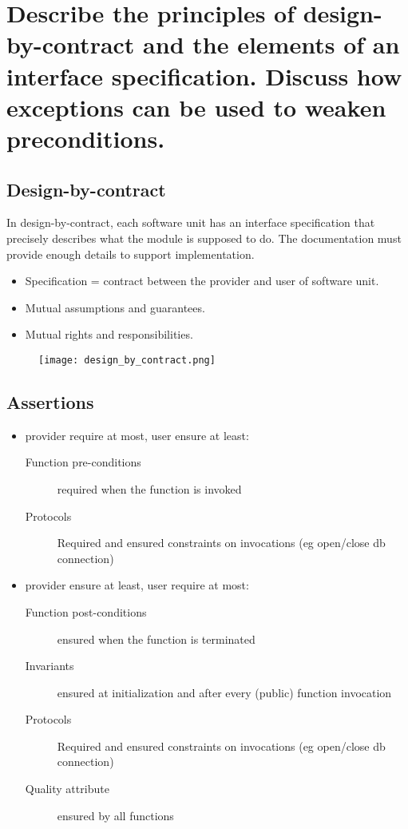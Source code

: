 \clearpage{}
\section{Describe the principles of design-by-contract and the elements
of an interface specification. Discuss how exceptions can be used to
weaken preconditions.}


\subsection{Design-by-contract}

In design-by-contract, each software unit has an interface specification that precisely
describes what the module is supposed to do. The documentation must provide enough
details to support implementation. 

\begin{itemize}
    \item Specification = contract between the provider and user of software unit. 
    \item Mutual assumptions and guarantees. 
    \item Mutual rights and responsibilities.
\end{itemize}

\begin{figure}[!ht]
    \centering
    \texttt{[image: design\_by\_contract.png]}
\end{figure}

\subsection{Assertions}

\begin{itemize}
        \item provider require at most, user ensure at least:
\begin{description}
    \item[Function pre-conditions] required when the function is invoked
    \item[Protocols] Required and ensured constraints on invocations (eg open/close db connection)
\end{description}

        \item provider ensure at least, user require at most:
\begin{description}
    \item[Function post-conditions] ensured when the function is terminated
    \item[Invariants] ensured at initialization and after every (public) function invocation
    \item[Protocols] Required and ensured constraints on invocations (eg open/close db connection)
    \item[Quality attribute] ensured by all functions
\end{description}
\end{itemize}

